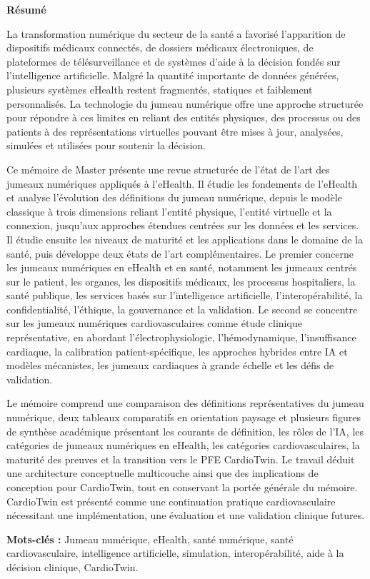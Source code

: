 \vspace*{4cm}
\begin{center}
    {\Huge\bfseries Résumé}
\end{center}
\vskip 1cm

{}

La transformation numérique du secteur de la santé a favorisé l'apparition de dispositifs médicaux connectés, de dossiers médicaux électroniques, de plateformes de télésurveillance et de systèmes d'aide à la décision fondés sur l'intelligence artificielle. Malgré la quantité importante de données générées, plusieurs systèmes eHealth restent fragmentés, statiques et faiblement personnalisés. La technologie du jumeau numérique offre une approche structurée pour répondre à ces limites en reliant des entités physiques, des processus ou des patients à des représentations virtuelles pouvant être mises à jour, analysées, simulées et utilisées pour soutenir la décision.

Ce mémoire de Master présente une revue structurée de l'état de l'art des jumeaux numériques appliqués à l'eHealth. Il étudie les fondements de l'eHealth et analyse l'évolution des définitions du jumeau numérique, depuis le modèle classique à trois dimensions reliant l'entité physique, l'entité virtuelle et la connexion, jusqu'aux approches étendues centrées sur les données et les services. Il étudie ensuite les niveaux de maturité et les applications dans le domaine de la santé, puis développe deux états de l'art complémentaires. Le premier concerne les jumeaux numériques en eHealth et en santé, notamment les jumeaux centrés sur le patient, les organes, les dispositifs médicaux, les processus hospitaliers, la santé publique, les services basés sur l'intelligence artificielle, l'interopérabilité, la confidentialité, l'éthique, la gouvernance et la validation. Le second se concentre sur les jumeaux numériques cardiovasculaires comme étude clinique représentative, en abordant l'électrophysiologie, l'hémodynamique, l'insuffisance cardiaque, la calibration patient-spécifique, les approches hybrides entre IA et modèles mécanistes, les jumeaux cardiaques à grande échelle et les défis de validation.

Le mémoire comprend une comparaison des définitions représentatives du jumeau numérique, deux tableaux comparatifs en orientation paysage et plusieurs figures de synthèse académique présentant les courants de définition, les rôles de l'IA, les catégories de jumeaux numériques en eHealth, les catégories cardiovasculaires, la maturité des preuves et la transition vers le PFE CardioTwin. Le travail déduit une architecture conceptuelle multicouche ainsi que des implications de conception pour CardioTwin, tout en conservant la portée générale du mémoire. CardioTwin est présenté comme une continuation pratique cardiovasculaire nécessitant une implémentation, une évaluation et une validation clinique futures.

\textbf{Mots-clés :} Jumeau numérique, eHealth, santé numérique, santé cardiovasculaire, intelligence artificielle, simulation, interopérabilité, aide à la décision clinique, CardioTwin.

\clearpage
